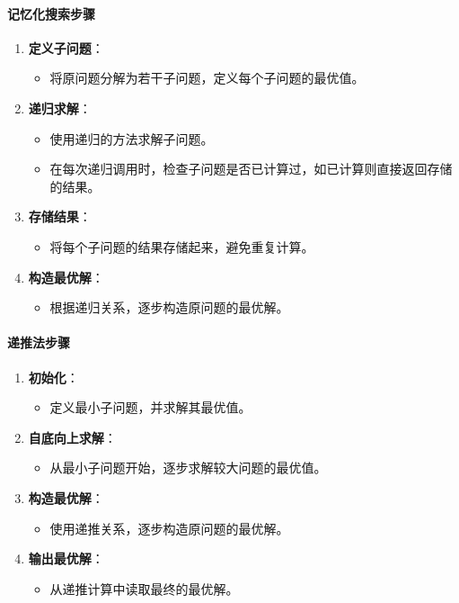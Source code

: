 \documentclass[UTF8]{ctexart}
\begin{document}
\paragraph{记忆化搜索步骤}
\begin{enumerate}
    \item \textbf{定义子问题}：
        \begin{itemize}
            \item 将原问题分解为若干子问题，定义每个子问题的最优值。
        \end{itemize}
    \item \textbf{递归求解}：
        \begin{itemize}
            \item 使用递归的方法求解子问题。
            \item 在每次递归调用时，检查子问题是否已计算过，如已计算则直接返回存储的结果。
        \end{itemize}
    \item \textbf{存储结果}：
        \begin{itemize}
            \item 将每个子问题的结果存储起来，避免重复计算。
        \end{itemize}
    \item \textbf{构造最优解}：
        \begin{itemize}
            \item 根据递归关系，逐步构造原问题的最优解。
        \end{itemize}
\end{enumerate}

\paragraph{递推法步骤}
\begin{enumerate}
    \item \textbf{初始化}：
        \begin{itemize}
            \item 定义最小子问题，并求解其最优值。
        \end{itemize}
    \item \textbf{自底向上求解}：
        \begin{itemize}
            \item 从最小子问题开始，逐步求解较大问题的最优值。
        \end{itemize}
    \item \textbf{构造最优解}：
        \begin{itemize}
            \item 使用递推关系，逐步构造原问题的最优解。
        \end{itemize}
    \item \textbf{输出最优解}：
        \begin{itemize}
            \item 从递推计算中读取最终的最优解。
        \end{itemize}
\end{enumerate}
\end{document}
